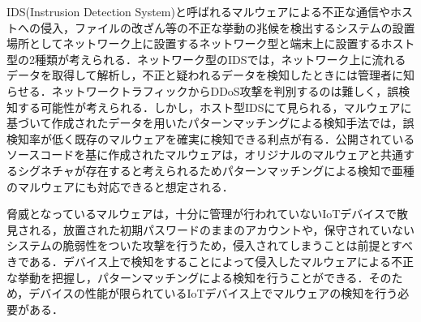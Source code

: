IDS(Instrusion Detection System)と呼ばれるマルウェアによる不正な通信やホストへの侵入，ファイルの改ざん等の不正な挙動の兆候を検出するシステムの設置場所としてネットワーク上に設置するネットワーク型と端末上に設置するホスト型の2種類が考えられる．ネットワーク型のIDSでは，ネットワーク上に流れるデータを取得して解析し，不正と疑われるデータを検知したときには管理者に知らせる．ネットワークトラフィックからDDoS攻撃を判別するのは難しく，誤検知する可能性が考えられる．しかし，ホスト型IDSにて見られる，マルウェアに基づいて作成されたデータを用いたパターンマッチングによる検知手法では，誤検知率が低く既存のマルウェアを確実に検知できる利点が有る．公開されているソースコードを基に作成されたマルウェアは，オリジナルのマルウェアと共通するシグネチャが存在すると考えられるためパターンマッチングによる検知で亜種のマルウェアにも対応できると想定される．\par
脅威となっているマルウェアは，十分に管理が行われていないIoTデバイスで散見される，放置された初期パスワードのままのアカウントや，保守されていないシステムの脆弱性をついた攻撃を行うため，侵入されてしまうことは前提とすべきである．デバイス上で検知をすることによって侵入したマルウェアによる不正な挙動を把握し，パターンマッチングによる検知を行うことができる．そのため，デバイスの性能が限られているIoTデバイス上でマルウェアの検知を行う必要がある．

